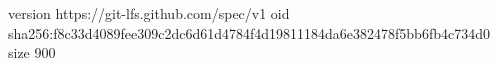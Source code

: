 version https://git-lfs.github.com/spec/v1
oid sha256:f8c33d4089fee309c2dc6d61d4784f4d19811184da6e382478f5bb6fb4c734d0
size 900
